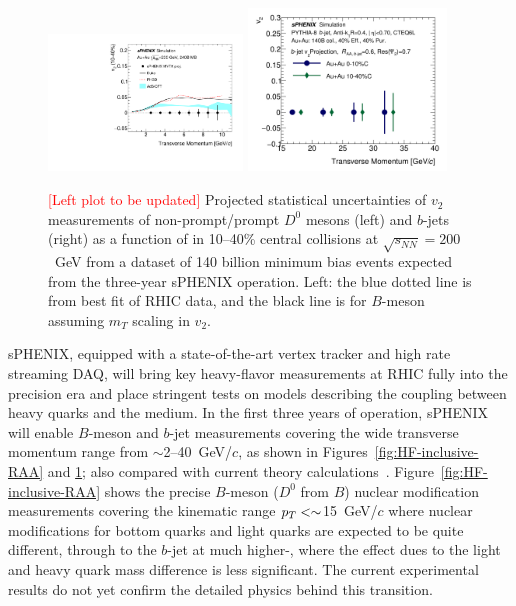 \begin{figure}[htbp]
\centering
\includegraphics[width=0.46\textwidth]{figs/v2_proj_240B_theory.pdf}
\includegraphics[width=0.47\textwidth]{figs/200pp_pythia8_CTEQ6L_7GeV_ALL_cfg_eneg_DSTReader_root_Draw_HFJetTruth_CrossSection2v2_3yr_EPR0_7_deta0_70.pdf}
\caption{ {\textcolor{red}{[Left plot to be updated]}} Projected statistical uncertainties of $v_2$ measurements of
  non-prompt/prompt $D^0$ mesons (left) and $b$-jets (right) as a
  function of \pT in 10--40\% central \auau collisions at
  $\sqrt{s_{NN}}=200$~GeV from a dataset of 140 billion minimum bias
  \auau events expected from the three-year sPHENIX operation.  Left:
  the blue dotted line is from best fit of RHIC data, and the black
  line is for $B$-meson assuming $m_T$ scaling in
  $v_2$. \cite{Adamczyk:2017xur, Duke, TAMU, PHSD}}
\label{fig:HF-v2}
\end{figure}

sPHENIX, equipped with a state-of-the-art vertex tracker and high rate
streaming DAQ, will bring key heavy-flavor measurements at RHIC fully
into the precision era and place stringent tests on models describing
the coupling between heavy quarks and the medium. In the first three
years of operation, sPHENIX will enable $B$-meson and $b$-jet
measurements covering the wide transverse momentum range from
$\sim$2--40~GeV/$c$, as shown in Figures~\ref{fig:HF-inclusive-RAA} and
\ref{fig:HF-v2}; also compared with current theory
calculations~\cite{Duke,TAMU,PHSD,CUJET,Huang:2013vaa,Ke:2020nsm}.  
Figure~\ref{fig:HF-inclusive-RAA} shows the precise $B$-meson ($D^{0}$ from $B$) nuclear
modification measurements covering the kinematic range $\mbox{${p_T}$} <\sim$15~GeV/$c$ where
nuclear modifications for bottom quarks and light quarks are expected
to be quite different, through to the $b$-jet at much higher-\pT,
where the effect dues to the light and heavy quark mass difference is
less significant.  The current experimental results do not yet confirm
the detailed physics behind this transition.  

